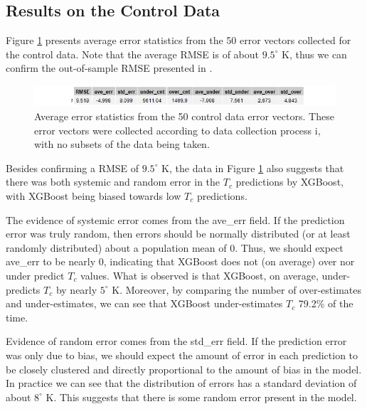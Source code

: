 \documentclass[oneside,12pt]{amsart}
\begin{document}
 \subsection{Results on the Control Data}
  Figure \ref{fig:control_table} presents average error statistics from the 50 error vectors collected for the control data. Note that the average RMSE is of about $9.5^\circ$ K, thus we can confirm the out-of-sample RMSE presented in \cite{hamidieh_data-driven_2018}.
 
 \begin{figure}[h]
     \centering
     \includegraphics[width = \linewidth]{Control_tbl.png}
     \caption{Average error statistics from the 50 control data error vectors. These error vectors were collected according to data collection process i, with no subsets of the data being taken.}
     \label{fig:control_table}
 \end{figure}

Besides confirming a RMSE of $9.5^\circ$ K, the data in Figure \ref{fig:control_table} also suggests that there was both systemic and random error in the $T_c$ predictions by XGBoost, with XGBoost being biased towards low $T_c$ predictions.

The evidence of systemic error comes from the ave\_err field. If the prediction error was truly random, then errors should be normally distributed (or at least randomly distributed) about a population mean of 0. Thus, we should expect ave\_err to be nearly 0, indicating that XGBoost does not (on average) over nor under predict $T_c$ values. What is observed is that XGBoost, on average, under-predicts $T_c$ by nearly $5^\circ$ K. Moreover, by comparing the number of over-estimates and under-estimates, we can see that XGBoost under-estimates $T_c$ 79.2\% of the time.

Evidence of random error comes from the std\_err field. If the prediction error was only due to bias, we should expect the amount of error in each prediction to be closely clustered and directly proportional to the amount of bias in the model. In practice we can see that the distribution of errors has a standard deviation of about $8^\circ$ K. This suggests that there is some random error present in the model.
\end{document}
